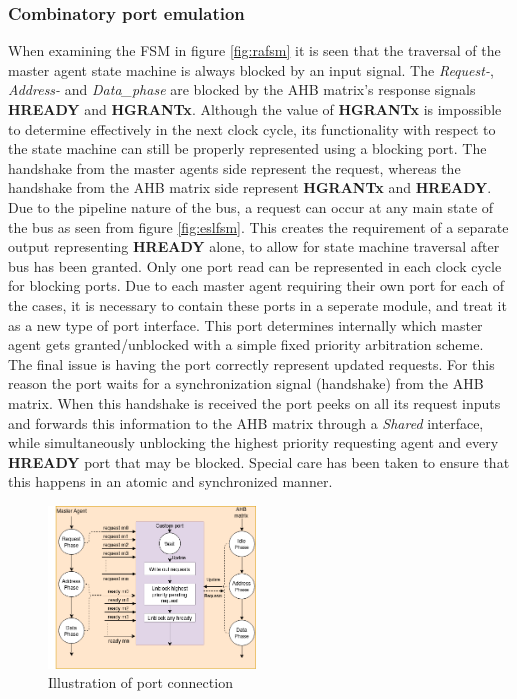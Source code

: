 \subsubsection{Combinatory port emulation}
When examining the FSM in figure \ref{fig:rafsm} it is seen that the traversal of the master agent state machine is always blocked by an input signal. The \textit{Request-}, \textit{Address-} and \textit{Data\_phase} are blocked by the AHB matrix's response signals \textbf{HREADY} and \textbf{HGRANTx}. Although the value of \textbf{HGRANTx} is impossible to determine effectively in the next clock cycle, its functionality with respect to the state machine can still be properly represented using a blocking port. The handshake from the master agents side represent the request, whereas the handshake from the AHB matrix side represent \textbf{HGRANTx} and \textbf{HREADY}. Due to the pipeline nature of the bus, a request can occur at any main state of the bus as seen from figure \ref{fig:eslfsm}. This creates the requirement of a separate output representing \textbf{HREADY} alone, to allow for state machine traversal after bus has been granted. Only one port read can be represented in each clock cycle for blocking ports. Due to each master agent requiring their own port for each of the cases, it is necessary to contain these ports in a seperate module, and treat it as a new type of port interface.
This port determines internally which master agent gets granted/unblocked with a simple fixed priority arbitration scheme. The final issue is having the port correctly represent updated requests. For this reason the port waits for a synchronization signal (handshake) from the AHB matrix. When this handshake is received the port peeks on all its request inputs and forwards this information to the AHB matrix through a \textit{Shared} interface, while simultaneously unblocking the highest priority requesting agent and every \textbf{HREADY} port that may be blocked. Special care has been taken to ensure that this happens in an atomic and synchronized manner.   
\begin{figure}
\includegraphics[width=5.5cm]{figs/ESL/port_diagram.png}
\caption{Illustration of port connection}\label{fig:cport}
\end{figure}


